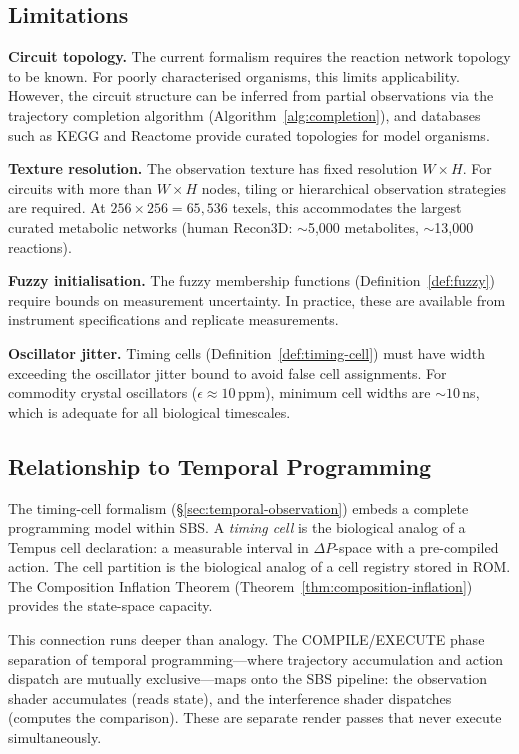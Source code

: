 \documentclass[11pt,twocolumn,a4paper]{article}
\newcommand{\DP}{\Delta P}
\begin{document}
\subsection{Limitations}

\textbf{Circuit topology.}  The current formalism requires the
reaction network topology to be known.  For poorly characterised
organisms, this limits applicability.  However, the circuit structure
can be inferred from partial observations via the trajectory completion
algorithm (Algorithm~\ref{alg:completion}), and databases such as
KEGG and Reactome provide curated topologies for model organisms.

\textbf{Texture resolution.}  The observation texture has fixed
resolution $W \times H$.  For circuits with more than $W \times H$
nodes, tiling or hierarchical observation strategies are required.
At $256 \times 256 = 65{,}536$ texels, this accommodates the largest
curated metabolic networks (human Recon3D: $\sim$5{,}000 metabolites,
$\sim$13{,}000 reactions).

\textbf{Fuzzy initialisation.}  The fuzzy membership functions
(Definition~\ref{def:fuzzy}) require bounds on measurement
uncertainty.  In practice, these are available from instrument
specifications and replicate measurements.

\textbf{Oscillator jitter.}  Timing cells
(Definition~\ref{def:timing-cell}) must have width exceeding the
oscillator jitter bound to avoid false cell assignments.  For commodity
crystal oscillators ($\epsilon \approx 10$\,ppm), minimum cell widths
are $\sim\!10$\,ns, which is adequate for all biological
timescales.

\subsection{Relationship to Temporal Programming}

The timing-cell formalism (\S\ref{sec:temporal-observation}) embeds a
complete programming model within SBS.  A \emph{timing cell} is the
biological analog of a Tempus cell declaration: a measurable interval
in $\DP$-space with a pre-compiled action.  The cell partition is
the biological analog of a cell registry stored in ROM.  The
Composition Inflation Theorem
(Theorem~\ref{thm:composition-inflation}) provides the state-space
capacity.

This connection runs deeper than analogy.  The COMPILE/EXECUTE phase
separation of temporal programming---where trajectory accumulation and
action dispatch are mutually exclusive---maps onto the SBS pipeline:
the observation shader accumulates (reads state), and the interference
shader dispatches (computes the comparison).  These are separate render
passes that never execute simultaneously.
\end{document}
